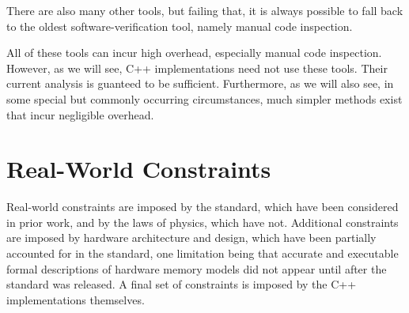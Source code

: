 \documentclass[10]{article}
\begin{document}
There are also many other tools, but failing that, it is always possible
to fall back to the oldest software-verification tool, namely manual
code inspection.

All of these tools can incur high overhead, especially manual code
inspection.
However, as we will see, C++ implementations need not use these tools.
Their current analysis is guanteed to be sufficient.
Furthermore, as we will also see, in some special but commonly occurring
circumstances, much simpler methods exist that incur negligible overhead.



\section{Real-World Constraints}
\label{sec:Real-World Constraints}

Real-world constraints are imposed by the standard, which have been
considered in prior work, and by the laws of physics, which have
not.
Additional constraints are imposed by hardware architecture and
design, which have been partially accounted for in the standard,
one limitation being that accurate and executable formal descriptions
of hardware memory models did not appear until after the standard
was released.
A final set of constraints is imposed by the C++ implementations
themselves.
\end{document}
